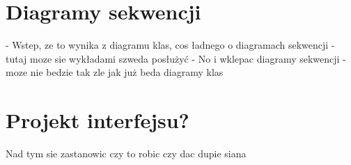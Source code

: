 \section{Diagramy sekwencji}
- Wstep, ze to wynika z diagramu klas, cos ładnego o diagramach sekwencji - tutaj moze sie wykładami szweda posłużyć \newline
- No i wklepac diagramy sekwencji - moze nie bedzie tak zle jak już beda diagramy klas \newline
\section {Projekt interfejsu?}
Nad tym sie zastanowic czy to robic czy dac dupie siana

